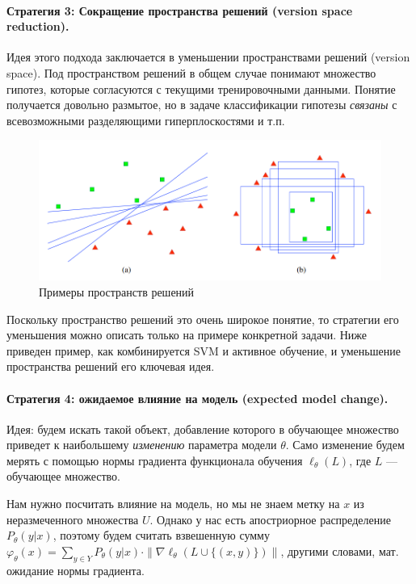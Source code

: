 \documentclass[specialist, 12pt, href]{article}
\begin{document}
\paragraph{Стратегия 3: Сокращение пространства решений (version space
reduction).}

Идея этого подхода заключается в уменьшении пространствами решений
(version space). Под пространством решений в общем случае понимают
множество гипотез, которые согласуются с текущими тренировочными
данными. Понятие получается довольно размытое, но в задаче классификации
гипотезы \emph{связаны} с всевозможными разделяющими гиперплоскостями и
т.п.

\begin{figure}[htbp]
\centering
\includegraphics[width=6in]{img/vs.png}
\caption{Примеры пространств решений}
\end{figure}

Поскольку пространство решений это очень широкое понятие, то стратегии
его уменьшения можно описать только на примере конкретной задачи. Ниже
приведен пример, как комбинируется SVM и активное обучение, и уменьшение
пространства решений его ключевая идея.

\paragraph{Стратегия 4: ожидаемое влияние на модель (expected model
change).}

Идея: будем искать такой объект, добавление которого в обучающее
множество приведет к наибольшему \emph{изменению} параметра модели
\(\theta\). Само изменение будем мерять с помощью нормы градиента
функционала обучения \(\ell_{\theta}(L)\), где \(L\) --- обучающее
множество.

Нам нужно посчитать влияние на модель, но мы не знаем метку на \(x\) из
неразмеченного множества \(U\). Однако у нас есть апостриорное
распределение \(P_{\theta}(y|x)\), поэтому будем считать взвешенную
сумму
\(\varphi_{\theta}(x) = \sum_{y \in Y} P_{\theta}(y|x) \cdot \| \nabla\ell_{\theta}(L \cup \{(x, y)\})\|\),
другими словами, мат. ожидание нормы градиента.
\end{document}
